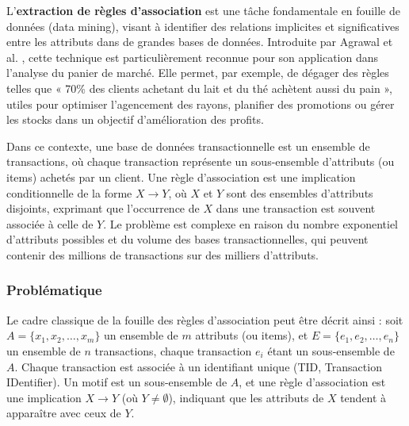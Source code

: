 \documentclass[a4paper,12pt]{report}
\begin{document}
        L'\textbf{extraction de règles d’association} est une tâche fondamentale en fouille de données (data mining), visant à identifier des relations implicites et significatives entre les attributs dans de grandes bases de données. Introduite par Agrawal et al. , cette technique est particulièrement reconnue pour son application dans l’analyse du panier de marché. Elle permet, par exemple, de dégager des règles telles que « 70\% des clients achetant du lait et du thé achètent aussi du pain », utiles pour optimiser l’agencement des rayons, planifier des promotions ou gérer les stocks dans un objectif d’amélioration des profits.
        
        Dans ce contexte, une base de données transactionnelle est un ensemble de transactions, où chaque transaction représente un sous-ensemble d’attributs (ou items) achetés par un client. Une règle d’association est une implication conditionnelle de la forme \( X \rightarrow Y \), où \( X \) et \( Y \) sont des ensembles d’attributs disjoints, exprimant que l’occurrence de \( X \) dans une transaction est souvent associée à celle de \( Y \). Le problème est complexe en raison du nombre exponentiel d’attributs possibles et du volume des bases transactionnelles, qui peuvent contenir des millions de transactions sur des milliers d’attributs.
        
        
        \subsubsection{Problématique}
        \label{sec:prob_assoc}
        
        Le cadre classique de la fouille des règles d’association peut être décrit ainsi : soit \( A = \{x_1, x_2, \dots, x_m\} \) un ensemble de \( m \) attributs (ou items), et \( E = \{e_1, e_2, \dots, e_n\} \) un ensemble de \( n \) transactions, chaque transaction \( e_i \) étant un sous-ensemble de \( A \). Chaque transaction est associée à un identifiant unique (TID, Transaction IDentifier). Un motif est un sous-ensemble de \( A \), et une règle d’association est une implication \( X \rightarrow Y \) (où \( Y \neq \emptyset \)), indiquant que les attributs de \( X \) tendent à apparaître avec ceux de \( Y \).
        
\end{document}
